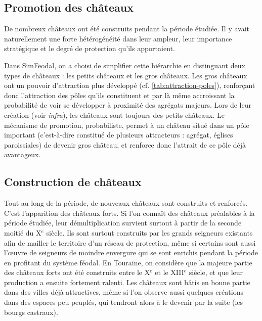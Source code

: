 \subsection{Promotion des châteaux}

De nombreux châteaux ont été construits pendant la période étudiée.
Il y avait naturellement une forte hétérogénéité dans leur ampleur, leur importance stratégique et le degré de protection qu'ils apportaient.

Dans SimFeodal, on a choisi de simplifier cette hiérarchie en distinguant deux types de châteaux : les \og petits châteaux\fg{} et les \og gros châteaux\fg{}.
Les gros châteaux ont un pouvoir d'attraction plus développé (cf. \cref{tab:attraction-poles}), renforçant donc l'attraction des pôles qu'ils constituent et par là même accroissant la probabilité de voir se développer à proximité des agrégats majeurs.
Lors de leur création (voir \textit{infra}), les châteaux sont toujours des \og petits châteaux\fg{}.
Le mécanisme de promotion, probabiliste, permet à un château situé dans un pôle important (c'est-à-dire constitué de plusieurs attracteurs : agrégat, églises paroissiales) de devenir \og gros château\fg{}, et renforce donc l'attrait de ce pôle déjà avantageux.

\subsection{Construction de châteaux}

Tout au long de la période, de nouveaux châteaux sont construits et renforcés. C'est l'apparition des \og châteaux forts\fg{}.
Si l'on connaît des châteaux préalables à la période étudiée, leur démultiplication survient surtout à partir de la seconde moitié du X$^e$ siècle.
Ils sont surtout construits par les grands seigneurs existants afin de mailler le territoire d'un réseau de protection, même si certains sont aussi l'œuvre de seigneurs de moindre envergure qui se sont enrichis pendant la période en profitant du système féodal.
En Touraine, on considère que la majeure partie des châteaux forts ont été construits entre le X$^e$ et le XIII$^e$ siècle, et que leur production a ensuite fortement ralenti.
Les châteaux sont bâtis en bonne partie dans des villes déjà attractives, même si l'on observe aussi quelques créations dans des espaces peu peuplés, qui tendront alors à le devenir par la suite (les bourgs castraux).


